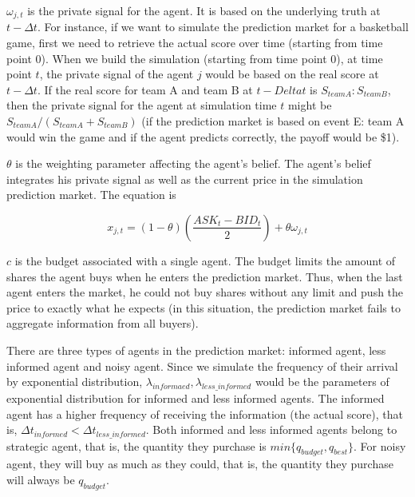 \documentclass{article}
\begin{document}
        $\omega_{j,t}$ is the private signal for the agent. It is based on the underlying truth at $t-\Delta t$. For instance, if we want to simulate the prediction market for a basketball game, first we need to retrieve the actual score over time (starting from time point $0$). When we build the simulation (starting from time point $0$), at time point $t$, the private signal of the agent $j$ would be based on the real score at $t-\Delta t$. If the real score for team A and team B at $t-Delta t$ is $S_{team A}:S_{team B}$, then the private signal for the agent at simulation time $t$ might be $S_{team A}/(S_{team A}+S_{team B})$ (if the prediction market is based on event E: team A would win the game and if the agent predicts correctly, the payoff would be \$1).
        
        $\theta$ is the weighting parameter affecting the agent's belief. The agent's belief integrates his private signal as well as the current price in the simulation prediction market. The equation is
        
        \begin{equation}
            x_{j,t}=(1-\theta)\left(\frac{ASK_t-BID_t}{2}\right)+\theta\omega_{j,t}
        \end{equation}
        
        $c$ is the budget associated with a single agent. The budget limits the amount of shares the agent buys when he enters the prediction market. Thus, when the last agent enters the market, he could not buy shares without any limit and push the price to exactly what he expects (in this situation, the prediction market fails to aggregate information from all buyers).
        
        There are three types of agents in the prediction market: informed agent, less informed agent and noisy agent. Since we simulate the frequency of their arrival by exponential distribution, $\lambda_{informaed}, \lambda_{less\_ informed}$ would be the parameters of exponential distribution for informed and less informed agents. The informed agent has a higher frequency of receiving the information (the actual score),  that is, $\Delta t_{informed}<\Delta t_{less\_informed}$. Both informed and less informed agents belong to strategic agent, that is, the quantity they purchase is $min\{q_{budget}, q_{best}\}$. For noisy agent, they will buy as much as they could, that is, the quantity they purchase will always be $q_{budget}$. 
\end{document}
